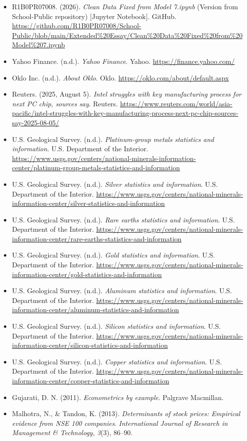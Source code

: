 \documentclass[12pt]{article}
\begin{document}
\begin{itemize}
    \item R1B0PR07008. (2026). \textit{Clean Data Fixed from Model 7.ipynb} (Version from School-Public repository) [Jupyter Notebook]. GitHub. \url{https://github.com/R1B0PR07008/School-Public/blob/main/Extended%20Essay/Clean%20Data%20Fixed%20from%20Model%207.ipynb}
    \item Yahoo Finance. (n.d.). \textit{Yahoo Finance}. Yahoo. \url{https://finance.yahoo.com/}
    \item Oklo Inc. (n.d.). \textit{About Oklo}. Oklo. \url{https://oklo.com/about/default.aspx}
    \item Reuters. (2025, August 5). \textit{Intel struggles with key manufacturing process for next PC chip, sources say}. Reuters. \url{https://www.reuters.com/world/asia-pacific/intel-struggles-with-key-manufacturing-process-next-pc-chip-sources-say-2025-08-05/}
    \item U.S. Geological Survey. (n.d.). \textit{Platinum-group metals statistics and information}. U.S. Department of the Interior. \url{https://www.usgs.gov/centers/national-minerals-information-center/platinum-group-metals-statistics-and-information}
    \item U.S. Geological Survey. (n.d.). \textit{Silver statistics and information}. U.S. Department of the Interior. \url{https://www.usgs.gov/centers/national-minerals-information-center/silver-statistics-and-information}
    \item U.S. Geological Survey. (n.d.). \textit{Rare earths statistics and information}. U.S. Department of the Interior. \url{https://www.usgs.gov/centers/national-minerals-information-center/rare-earths-statistics-and-information}
    \item U.S. Geological Survey. (n.d.). \textit{Gold statistics and information}. U.S. Department of the Interior. \url{https://www.usgs.gov/centers/national-minerals-information-center/gold-statistics-and-information}
    \item U.S. Geological Survey. (n.d.). \textit{Aluminum statistics and information}. U.S. Department of the Interior. \url{https://www.usgs.gov/centers/national-minerals-information-center/aluminum-statistics-and-information}
    \item U.S. Geological Survey. (n.d.). \textit{Silicon statistics and information}. U.S. Department of the Interior. \url{https://www.usgs.gov/centers/national-minerals-information-center/silicon-statistics-and-information}
    \item U.S. Geological Survey. (n.d.). \textit{Copper statistics and information}. U.S. Department of the Interior. \url{https://www.usgs.gov/centers/national-minerals-information-center/copper-statistics-and-information}
    \item Gujarati, D. N. (2011). \textit{Econometrics by example}. Palgrave Macmillan.
    \item Malhotra, N., \& Tandon, K. (2013). \textit{Determinants of stock prices: Empirical evidence from NSE 100 companies}. \textit{International Journal of Research in Management \& Technology, 3}(3), 86--90.
\end{itemize}
\end{document}
